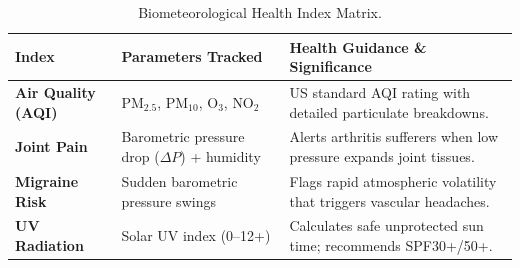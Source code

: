 \documentclass[11pt,a4paper]{article}
\begin{document}
\begin{table}[H]
\centering
\small
\begin{tabularx}{\textwidth}{@{} l p{5.5cm} p{7cm} @{}}
\toprule
\textbf{Index} & \textbf{Parameters Tracked} & \textbf{Health Guidance \& Significance} \\
\midrule
\textbf{Air Quality (AQI)} & $\text{PM}_{2.5}$, $\text{PM}_{10}$, $\text{O}_3$, $\text{NO}_2$ & US standard AQI rating with detailed particulate breakdowns. \\
\addlinespace
\textbf{Joint Pain} & Barometric pressure drop ($\Delta P$) + humidity & Alerts arthritis sufferers when low pressure expands joint tissues. \\
\addlinespace
\textbf{Migraine Risk} & Sudden barometric pressure swings & Flags rapid atmospheric volatility that triggers vascular headaches. \\
\addlinespace
\textbf{UV Radiation} & Solar UV index (0--12+) & Calculates safe unprotected sun time; recommends SPF30+/50+. \\
\bottomrule
\end{tabularx}
\caption{Biometeorological Health Index Matrix.}
\end{table}
\end{document}
